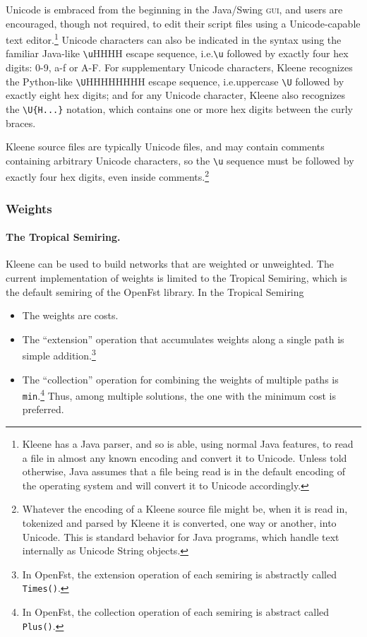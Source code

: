 \documentclass[letterpaper,12pt]{article}
\newcommand{\Kleene}{Kleene\xspace}
\newcommand{\acro}{\textsc}
\begin{document}
Unicode is embraced from the beginning in the Java/Swing \acro{gui}, and users
are encouraged, though not required, to edit
their script files using a Unicode-capable text editor.\footnote{\Kleene{} has a Java
parser, and so is able, using normal Java features, to read a file in
almost any known encoding and convert it to Unicode.  Unless told otherwise,
Java assumes that a file being read is in the default encoding of the
operating system and will convert it to Unicode accordingly.}  Unicode
characters can also
be indicated in the syntax using the familiar Java-like \verb!\u!HHHH
escape sequence, i.e.\@ \verb!\u! followed by exactly four hex
digits: 0-9, a-f or A-F.  For
supplementary Unicode characters, Kleene recognizes the Python-like
\verb!\U!HHHHHHHH escape sequence, i.e.\@ uppercase
\verb!\U! followed by exactly eight hex digits; and for any Unicode
character, Kleene also recognizes the
\verb!\U{H...}! notation, which contains one or more hex digits between the
curly braces.

Kleene source files are typically Unicode files, and may contain comments
containing arbitrary Unicode characters, so the \verb!\u!  sequence must be
followed by exactly four hex digits, even inside comments.\footnote{Whatever
the encoding of a Kleene source file might be, when it is read in, tokenized
and parsed by Kleene it is converted, one way or another, into Unicode.  This
is standard behavior for Java programs, which handle text internally as
Unicode String objects.}



\subsubsection{Weights}

\paragraph{The Tropical Semiring.}  Kleene can be used to build networks that are weighted or unweighted.
The current implementation of weights is limited to the
Tropical Semiring, which is the default semiring of the OpenFst library.
In the Tropical Semiring

\begin{itemize}
\item
The weights are costs.
\item
The ``extension'' operation that accumulates weights along a single
path is simple addition.\footnote{In OpenFst, the extension operation of
each
semiring is abstractly called \texttt{Times()}.}
\item
The ``collection'' operation for combining the weights of multiple
paths is \texttt{min}.\footnote{In OpenFst, the collection
operation of each semiring is abstract called \texttt{Plus()}.}
Thus, among multiple solutions, the one with the minimum cost is preferred.
\end{itemize}
\end{document}

